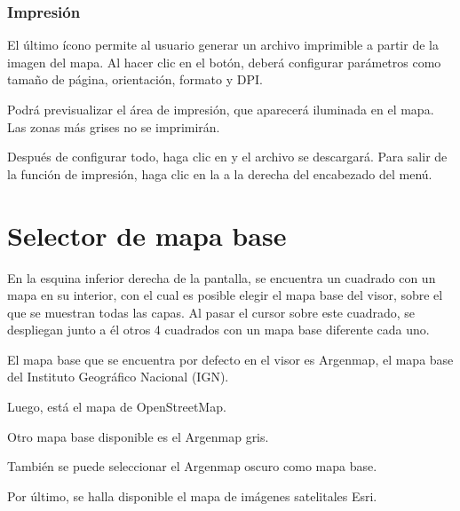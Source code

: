 \documentclass[a4paper,11pt,spanish]{sphinxmanual}
\begin{document}
\subsubsection{Impresión}
\label{\detokenize{tools/measuring:impresion}}
\sphinxAtStartPar
El último ícono permite al usuario generar un archivo imprimible a partir de la imagen del mapa. Al hacer clic en el botón, deberá configurar parámetros como tamaño de página, orientación, formato y DPI.

\sphinxAtStartPar
Podrá previsualizar el área de impresión, que aparecerá iluminada en el mapa. Las zonas más grises no se imprimirán.

\sphinxAtStartPar
Después de configurar todo, haga clic en  y el archivo se descargará. Para salir de la función de impresión, haga clic en la  a la derecha del encabezado del menú.

\noindent{}

\sphinxstepscope


\section{Selector de mapa base}
\label{\detokenize{basemap/index:selector-de-mapa-base}}\label{\detokenize{basemap/index::doc}}
\sphinxAtStartPar
En la esquina inferior derecha de la pantalla, se encuentra un cuadrado con un mapa en su interior, con el cual es posible elegir el mapa base del visor, sobre el que se muestran todas las capas. Al pasar el cursor sobre este cuadrado, se despliegan junto a él otros 4 cuadrados con un mapa base diferente cada uno.


\sphinxAtStartPar
El mapa base que se encuentra por defecto en el visor es Argenmap, el mapa base del Instituto Geográfico Nacional (IGN).

\noindent{}

\sphinxAtStartPar
Luego, está el mapa de OpenStreetMap.

\noindent{}

\sphinxAtStartPar
Otro mapa base disponible es el Argenmap gris.

\noindent{}

\sphinxAtStartPar
También se puede seleccionar el Argenmap oscuro como mapa base.

\noindent{}

\sphinxAtStartPar
Por último, se halla disponible el mapa de imágenes satelitales Esri.

\noindent{}



\renewcommand{\indexname}{Índice}
\footnotesize\raggedright\printindex
\end{document}
